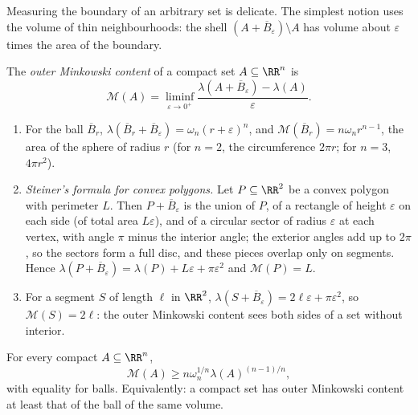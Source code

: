 Measuring the boundary of an arbitrary set is delicate. The simplest notion uses the volume of thin neighbourhoods: the shell $(A + \overline{B}_\varepsilon) \setminus A$ has volume about
$\varepsilon$ times the area of the boundary.

\begin{definition}\label{geometric-measure-theory:definition-minkowski-content}
The \emph{outer Minkowski content} of a compact set $A \subseteq \RR^n$ is
\[
\mathcal{M}(A) = \liminf_{\varepsilon \to 0^+}\frac{\lambda(A + \overline{B}_\varepsilon) - \lambda(A)}{\varepsilon}.
\]
\end{definition}

\begin{example}\label{geometric-measure-theory:example-minkowski-content}
\begin{enumerate}
\item For the ball $\overline{B}_r$, $\lambda(\overline{B}_r + \overline{B}_\varepsilon) = \omega_n(r + \varepsilon)^n$, and $\mathcal{M}(\overline{B}_r) = n\omega_nr^{n-1}$, the area of the sphere of radius
$r$ (for $n = 2$, the circumference $2\pi r$; for $n = 3$, $4\pi r^2$).
\item \emph{Steiner's formula for convex polygons.} Let $P \subseteq \RR^2$ be a convex polygon with perimeter $L$. Then $P + \overline{B}_\varepsilon$ is the union of $P$, of a rectangle of height $\varepsilon$
on each side (of total area $L\varepsilon$), and of a circular sector of radius $\varepsilon$ at each vertex, with angle $\pi$ minus the interior angle; the exterior angles add up to $2\pi$, so the
sectors form a full disc, and these pieces overlap only on segments. Hence $\lambda(P + \overline{B}_\varepsilon) = \lambda(P) + L\varepsilon + \pi\varepsilon^2$ and $\mathcal{M}(P) = L$.
\item For a segment $S$ of length $\ell$ in $\RR^2$, $\lambda(S + \overline{B}_\varepsilon) = 2\ell\varepsilon + \pi\varepsilon^2$, so $\mathcal{M}(S) = 2\ell$: the outer Minkowski content sees both sides of a set
without interior.
\end{enumerate}
\end{example}

\begin{theorem}\label{geometric-measure-theory:theorem-isoperimetric}
For every compact $A \subseteq \RR^n$,
\[
\mathcal{M}(A) \geq n\omega_n^{1/n}\lambda(A)^{(n-1)/n},
\]
with equality for balls. Equivalently: a compact set has outer Minkowski content at least that of the ball of the same volume.
\end{theorem}


